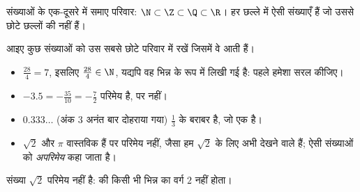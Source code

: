 \begin{omfigure}

{\small संख्याओं के एक-दूसरे में समाए परिवार: $\N \subset \Z \subset \Q \subset
\R$। हर छल्ले में ऐसी संख्याएँ हैं जो उससे छोटे छल्लों की नहीं हैं।}
\end{omfigure}

\begin{example}\label{ex:g10:numbers:classify}
आइए कुछ संख्याओं को उस सबसे छोटे परिवार में रखें जिसमें वे आती हैं।
\begin{itemize}
  \item $\frac{28}{4} = 7$, इसलिए $\frac{28}{4} \in \N$, यद्यपि वह भिन्न के
        रूप में लिखी गई है: पहले हमेशा सरल कीजिए।
  \item $-3.5 = -\frac{35}{10} = -\frac72$ परिमेय है, पर  नहीं।
  \item $0.333\dots$ (अंक $3$ अनंत बार दोहराया गया) $\frac13$ के बराबर है,
        जो एक  है।
  \item $\sqrt 2$ और $\pi$ वास्तविक हैं पर परिमेय नहीं, जैसा हम $\sqrt 2$ के लिए
        अभी देखने वाले हैं; ऐसी संख्याओं को
        \emph{अपरिमेय} कहा जाता है।
\end{itemize}
\end{example}

\begin{theorem}\label{thm:g10:numbers:sqrt2}
संख्या $\sqrt 2$ परिमेय नहीं है:  की किसी भी भिन्न का वर्ग $2$ नहीं होता।
\end{theorem}

